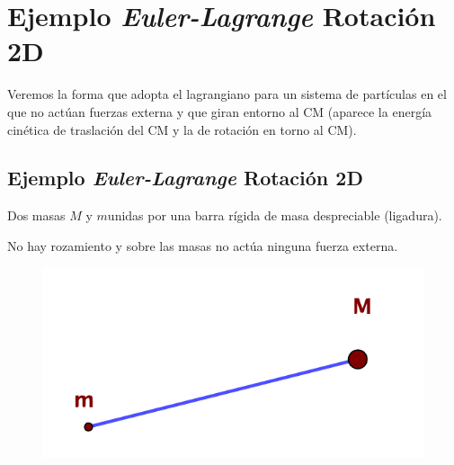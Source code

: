\chapter{Ejemplo \emph{Euler-Lagrange} Rotación 2D}


\vspace{1cm}
\begin{adjustwidth}{50pt}{50pt}
\begin{ejemplo}
Veremos la forma que adopta el lagrangiano para un sistema de partículas en el que no actúan fuerzas externa y que giran entorno al CM (aparece la energía cinética de traslación del CM y la de rotación en torno al CM).
\end{ejemplo}
\end{adjustwidth}



\section{Ejemplo \emph{Euler-Lagrange} Rotación 2D}
\label{T5ELroracion}


\begin{example}

\begin{multicols}{2}
Dos masas $M$ y $m$unidas por una barra rígida de masa despreciable (ligadura).

\vspace{2mm} No hay rozamiento y sobre las masas no actúa ninguna fuerza externa.
	\begin{figure}[H]
		\centering
		\includegraphics[width=.4\textwidth]{imagenes/img05-01.png}
	\end{figure}
\end{multicols}	
\end{example}

